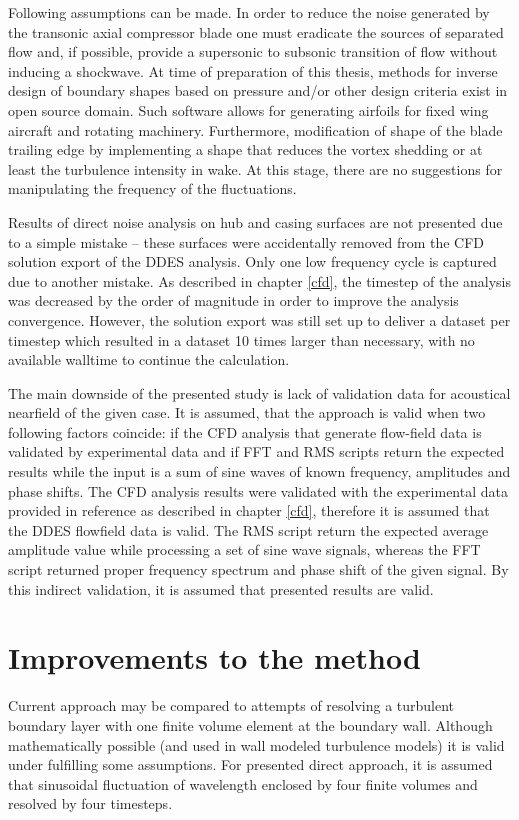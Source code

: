 Following assumptions can be made. In order to reduce the noise generated by the transonic axial compressor blade one must eradicate the sources of separated flow and, if possible, provide a supersonic to subsonic transition of flow without inducing a shockwave. At time of preparation of this thesis, methods for inverse design of boundary shapes based on pressure and/or other design criteria exist in open source domain. Such software allows for generating airfoils for fixed wing aircraft and rotating machinery. Furthermore, modification of shape of the blade trailing edge by implementing a shape that reduces the vortex shedding or at least the turbulence intensity in wake. At this stage, there are no suggestions for manipulating the frequency of the fluctuations.

Results of direct noise analysis on hub and casing surfaces are not presented due to a simple mistake -- these surfaces were  accidentally removed from the CFD solution export of the DDES analysis. Only one low frequency cycle is captured due to another mistake. As described in chapter \ref{cfd}, the timestep of the analysis was decreased by the order of magnitude in order to improve the analysis convergence. However, the solution export was still set up to deliver a dataset per timestep which resulted in a dataset 10 times larger than necessary, with no available walltime to continue the calculation.

The main downside of the presented study is lack of validation data for acoustical nearfield of the given case. It is assumed, that the approach is valid when two following factors coincide: if the CFD analysis that generate flow-field data is validated by experimental data and if FFT and RMS scripts return the expected results while the input is a sum of sine waves of known frequency, amplitudes and phase shifts. The CFD analysis results were validated with the experimental data provided in reference \citep{r67laser} as described in chapter \ref{cfd}, therefore it is assumed that the DDES flowfield data is valid. The RMS script return the expected average amplitude value while processing a set of sine wave signals, whereas the FFT script returned proper frequency spectrum and phase shift of the given signal. By this indirect validation, it is assumed that presented results are valid.

\section{Improvements to the method}
Current approach may be compared to attempts of resolving a turbulent boundary layer with one finite volume element at the boundary wall. Although mathematically possible (and used in wall modeled turbulence models) it is valid under fulfilling some assumptions. For presented direct approach, it is assumed that sinusoidal fluctuation of wavelength enclosed by four finite volumes and resolved by four timesteps.

